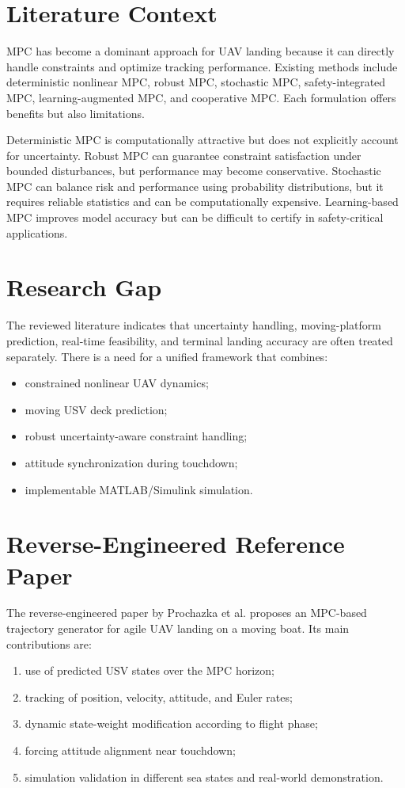 \documentclass[12pt,a4paper]{report}
\begin{document}
\section{Literature Context}
MPC has become a dominant approach for UAV landing because it can directly handle constraints and optimize tracking performance. Existing methods include deterministic nonlinear MPC, robust MPC, stochastic MPC, safety-integrated MPC, learning-augmented MPC, and cooperative MPC. Each formulation offers benefits but also limitations.

Deterministic MPC is computationally attractive but does not explicitly account for uncertainty. Robust MPC can guarantee constraint satisfaction under bounded disturbances, but performance may become conservative. Stochastic MPC can balance risk and performance using probability distributions, but it requires reliable statistics and can be computationally expensive. Learning-based MPC improves model accuracy but can be difficult to certify in safety-critical applications.

\section{Research Gap}
The reviewed literature indicates that uncertainty handling, moving-platform prediction, real-time feasibility, and terminal landing accuracy are often treated separately. There is a need for a unified framework that combines:
\begin{itemize}
    \item constrained nonlinear UAV dynamics;
    \item moving USV deck prediction;
    \item robust uncertainty-aware constraint handling;
    \item attitude synchronization during touchdown;
    \item implementable MATLAB/Simulink simulation.
\end{itemize}

\section{Reverse-Engineered Reference Paper}
The reverse-engineered paper by Prochazka et al. proposes an MPC-based trajectory generator for agile UAV landing on a moving boat. Its main contributions are:
\begin{enumerate}
    \item use of predicted USV states over the MPC horizon;
    \item tracking of position, velocity, attitude, and Euler rates;
    \item dynamic state-weight modification according to flight phase;
    \item forcing attitude alignment near touchdown;
    \item simulation validation in different sea states and real-world demonstration.
\end{enumerate}
\end{document}
